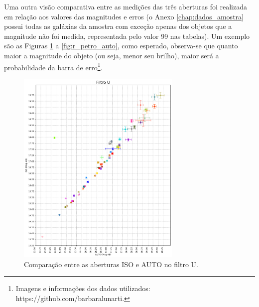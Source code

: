 Uma outra visão comparativa entre as medições das três aberturas foi realizada em relação aos valores das magnitudes e erros (o Anexo \ref{chap:dados_amostra} possui todas as galáxias da amostra com exceção apenas dos objetos que a magnitude não foi medida, representada pelo valor 99 nas tabelas). Um exemplo são as Figuras \ref{fig:iso_auto} a \ref{fig:r_petro_auto}, como esperado, observa-se que quanto maior a magnitude do objeto (ou seja, menor seu brilho), maior será a probabilidade da barra de erro\footnote{Imagens e informações dos dados utilizados: https://github.com/barbaralunarti.}.

\begin{figure}
  \centering 
  \includegraphics[width=0.7\textwidth]{Imagens/iso_auto.png} 
  \caption[Comparação entre as aberturas ISO e AUTO no filtro U.]{Comparação entre as aberturas ISO e AUTO no filtro U.}
  \label{fig:iso_auto} 
\end{figure}

